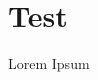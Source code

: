 \documentclass{article}
\begin{document}
\tableofcontents
\section{Test}
Lorem Ipsum
\end{document}
